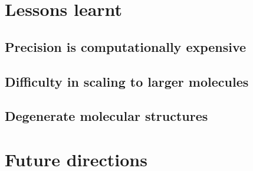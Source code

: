 \section{Lessons learnt}
\subsection{Precision is computationally expensive}
\subsection{Difficulty in scaling to larger molecules}
\subsection{Degenerate molecular structures}

\section{Future directions}